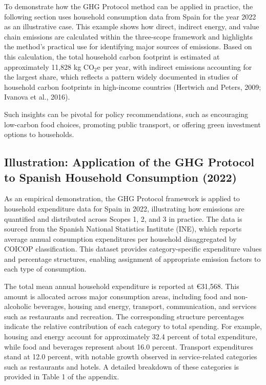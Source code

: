 \documentclass[12pt,a4paper]{article}%
\begin{document}
To demonstrate how the GHG Protocol method can be applied in practice, the following section uses household consumption data from Spain for the year 2022 as an illustrative case. This example shows how direct, indirect energy, and value chain emissions are calculated within the three-scope framework and highlights the method’s practical use for identifying major sources of emissions.
Based on this calculation, the total household carbon footprint is estimated at approximately 11,828 kg CO$_2$e per year, with indirect emissions accounting for the largest share, which reflects a pattern widely documented in studies of household carbon footprints in high-income countries (Hertwich and Peters, 2009; Ivanova et al., 2016).

 Such insights can be pivotal for policy recommendations, such as encouraging low-carbon food choices, promoting public transport, or offering green investment options to households.

\subsection{Illustration: Application of the GHG Protocol to Spanish Household Consumption (2022)}

As an empirical demonstration, the GHG Protocol framework is applied to household expenditure data for Spain in 2022, illustrating how emissions are quantified and distributed across Scopes 1, 2, and 3 in practice. The data is sourced from the Spanish National Statistics Institute (INE), which reports average annual consumption expenditures per household disaggregated by COICOP classification. This dataset provides category-specific expenditure values and percentage structures, enabling assignment of appropriate emission factors to each type of consumption.

The total mean annual household expenditure is reported at €31,568. This amount is allocated across major consumption areas, including food and non-alcoholic beverages, housing and energy, transport, communication, and services such as restaurants and recreation. The corresponding structure percentages indicate the relative contribution of each category to total spending. For example, housing and energy account for approximately 32.4 percent of total expenditure, while food and beverages represent about 16.0 percent. Transport expenditures stand at 12.0 percent, with notable growth observed in service-related categories such as restaurants and hotels. A detailed breakdown of these categories is provided in Table 1 of the appendix.
\end{document}
